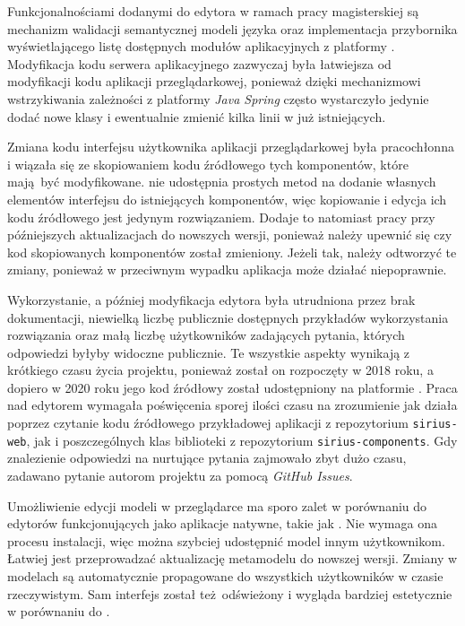 Funkcjonalnościami dodanymi do edytora w ramach pracy magisterskiej są
mechanizm walidacji semantycznej modeli języka \CAL{} oraz implementacja
przybornika wyświetlającego listę dostępnych modułów aplikacyjnych z platformy
\BalticLSC{}. Modyfikacja kodu serwera aplikacyjnego zazwyczaj była
łatwiejsza od modyfikacji kodu aplikacji przeglądarkowej, ponieważ dzięki
mechanizmowi wstrzykiwania zależności z platformy \emph{Java Spring}
często wystarczyło jedynie dodać nowe klasy i ewentualnie zmienić kilka linii w
już istniejących.

Zmiana kodu interfejsu użytkownika aplikacji przeglądarkowej była pracochłonna
i wiązała się ze skopiowaniem kodu źródłowego tych komponentów, które mają być
modyfikowane. \SiriusWeb{} nie udostępnia prostych metod na dodanie
własnych elementów interfejsu do istniejących komponentów, więc kopiowanie i
edycja ich kodu źródłowego jest jedynym rozwiązaniem. Dodaje to natomiast pracy
przy późniejszych aktualizacjach do nowszych wersji, ponieważ należy upewnić
się
czy kod skopiowanych komponentów został zmieniony. Jeżeli tak, należy odtworzyć
te zmiany, ponieważ w przeciwnym wypadku aplikacja może działać niepoprawnie.

Wykorzystanie, a później modyfikacja edytora \SiriusWeb{} była utrudniona
przez brak dokumentacji, niewielką liczbę publicznie dostępnych przykładów
wykorzystania rozwiązania oraz małą liczbę użytkowników zadających pytania,
których odpowiedzi byłyby widoczne publicznie. Te wszystkie aspekty wynikają z
krótkiego czasu życia projektu, ponieważ został on rozpoczęty w 2018 roku, a
dopiero w 2020 roku jego kod źródłowy został udostępniony na platformie
\GitHub{}. Praca nad edytorem wymagała poświęcenia sporej ilości czasu na
zrozumienie jak \SiriusWeb{} działa poprzez czytanie kodu źródłowego
przykładowej aplikacji z repozytorium \texttt{sirius-web}, jak i poszczególnych
klas biblioteki z repozytorium \texttt{sirius-components}. Gdy znalezienie
odpowiedzi na nurtujące pytania zajmowało zbyt dużo czasu, zadawano pytanie
autorom projektu za pomocą \emph{GitHub Issues}.

Umożliwienie edycji modeli w przeglądarce ma sporo zalet w porównaniu do
edytorów funkcjonujących jako aplikacje natywne, takie jak \SiriusDesktop{}.
Nie wymaga ona procesu instalacji, więc można szybciej
udostępnić
model innym użytkownikom. Łatwiej jest przeprowadzać aktualizację metamodelu do
nowszej wersji. Zmiany w modelach są automatycznie propagowane do wszystkich
użytkowników w czasie rzeczywistym. Sam interfejs został też~odświeżony i
wygląda bardziej estetycznie w porównaniu do \SiriusDesktop{}.

